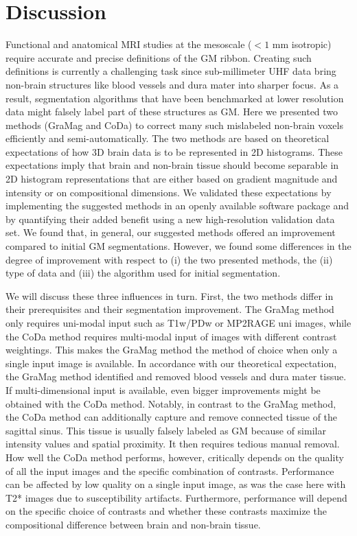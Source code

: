 \section{Discussion} \label{Discussion}
Functional and anatomical MRI studies at the mesoscale ($< 1$ mm isotropic) require accurate and precise definitions of the GM ribbon. Creating such definitions is currently a challenging task since sub-millimeter UHF data bring non-brain structures like blood vessels and dura mater into sharper focus. As a result, segmentation algorithms that have been benchmarked at lower resolution data might falsely label part of these structures as GM. Here we presented two methods (GraMag and CoDa) to correct many such mislabeled non-brain voxels efficiently and semi-automatically. The two methods are based on theoretical expectations of how 3D brain data is to be represented in 2D histograms. These expectations imply that brain and non-brain tissue should become separable in 2D histogram representations that are either based on gradient magnitude and intensity or on compositional dimensions. We validated these expectations by implementing the suggested methods in an openly available software package and by quantifying their added benefit using a new high-resolution validation data set. We found that, in general, our suggested methods offered an improvement compared to initial GM segmentations. However, we found some differences in the degree of improvement with respect to (i) the two presented methods, the (ii) type of data and (iii) the algorithm used for initial segmentation.

We will discuss these three influences in turn. First, the two methods differ in their prerequisites and their segmentation improvement. The GraMag method only requires uni-modal input such as T1w/PDw or MP2RAGE uni images, while the CoDa method requires multi-modal input of images with different contrast weightings. This makes the GraMag method the method of choice when only a single input image is available. In accordance with our theoretical expectation, the GraMag method identified and removed blood vessels and dura mater tissue. If multi-dimensional input is available, even bigger improvements might be obtained with the CoDa method. Notably, in contrast to the GraMag method, the CoDa method can additionally capture and remove connected tissue of the sagittal sinus. This tissue is usually falsely labeled as GM because of similar intensity values and spatial proximity. It then requires tedious manual removal. How well the CoDa method performs, however, critically depends on the quality of all the input images and the specific combination of contrasts. Performance can be affected by low quality on a single input image, as was the case here with T2* images due to susceptibility artifacts. Furthermore, performance will depend on the specific choice of contrasts and whether these contrasts maximize the compositional difference between brain and non-brain tissue.

